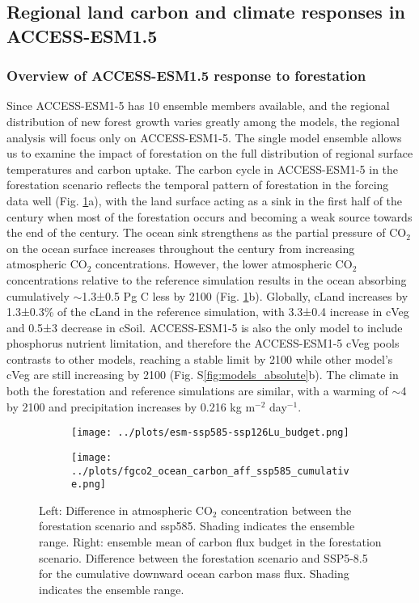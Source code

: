 \documentclass[]{article}
\begin{document}
\subsection{Regional land carbon and climate responses in ACCESS-ESM1.5}

\subsubsection{Overview of ACCESS-ESM1.5 response to forestation}

Since ACCESS-ESM1-5 has 10 ensemble members available, and the regional distribution of new forest growth varies greatly among the models, the regional analysis will focus only on ACCESS-ESM1-5.
The single model ensemble allows us to examine the impact of forestation on the full distribution of regional surface temperatures and carbon uptake.
The carbon cycle in ACCESS-ESM1-5 in the forestation scenario reflects the temporal pattern of forestation in the forcing data well (Fig. \ref{fig:global_carbon_budget}a), with the land surface acting as a sink in the first half of the century when most of the forestation occurs and becoming a weak source towards the end of the century.
The ocean sink strengthens as the partial pressure of CO$_2$ on the ocean surface increases throughout the century from increasing atmospheric CO$_2$ concentrations.
However, the lower atmospheric CO$_2$ concentrations relative to the reference simulation results in the ocean absorbing cumulatively $\sim$1.3±0.5 Pg C less by 2100 (Fig. \ref{fig:global_carbon_budget}b).
Globally, cLand increases by 1.3±0.3\% of the cLand in the reference simulation, with 3.3±0.4 increase in cVeg and 0.5±3 decrease in cSoil.
ACCESS-ESM1-5 is also the only model to include phosphorus nutrient limitation, and therefore the ACCESS-ESM1-5 cVeg pools contrasts to other models, reaching a stable limit by 2100 while other model's cVeg are still increasing by 2100 (Fig. S\ref{fig:models_absolute}b).
The climate in both the forestation and reference simulations are similar, with a warming of $\sim$4 \textcelsius{} by 2100 and precipitation increases by 0.216 kg m$^{-2}$ day$^{-1}$.

\begin{figure}[H]
    \centering
    \begin{subfigure}[b]{0.4\linewidth}
        \texttt{[image: ../plots/esm-ssp585-ssp126Lu\_budget.png]}
    \end{subfigure}
    \begin{subfigure}[b]{0.4\linewidth}
        \texttt{[image: ../plots/fgco2\_ocean\_carbon\_aff\_ssp585\_cumulative.png]}
    \end{subfigure}
    \caption{Left: Difference in atmospheric CO$_2$ concentration between the forestation scenario
    and ssp585. Shading indicates the ensemble range. Right: ensemble mean of carbon flux budget in
    the forestation scenario. Difference between the forestation scenario and SSP5-8.5 for the cumulative downward ocean carbon mass flux. Shading indicates the ensemble range.}
    \label{fig:global_carbon_budget}
\end{figure}
\end{document}
